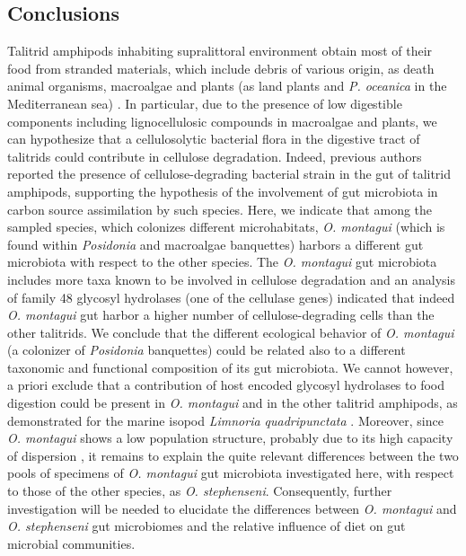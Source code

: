 \subsection{Conclusions}
Talitrid amphipods inhabiting supralittoral environment obtain most of their food from stranded materials, which include debris of various origin, as death animal organisms, macroalgae and plants (as land plants and \textit{P. oceanica} in the Mediterranean sea) \cite{adin2003preferential, colombini2011food}. In particular, due to the presence of low digestible components including lignocellulosic compounds in macroalgae and plants, we can hypothesize that a cellulosolytic bacterial flora in the digestive tract of talitrids could contribute in cellulose degradation. Indeed, previous authors \cite{nuti1971microrganisms, olabarria2009intraspecific} reported the presence of cellulose-degrading bacterial strain in the gut of talitrid amphipods, supporting the hypothesis of the involvement of gut microbiota in carbon source assimilation by such species. Here, we indicate that among the sampled species, which colonizes different microhabitats, \textit{O. montagui} (which is found within \textit{Posidonia} and macroalgae banquettes) harbors a different gut microbiota with respect to the other species. The \textit{O. montagui} gut microbiota includes more taxa known to be involved in cellulose degradation and an analysis of family 48 glycosyl hydrolases (one of the cellulase genes) indicated that indeed \textit{O. montagui} gut harbor a higher number of cellulose-degrading cells than the other talitrids. We conclude that the different ecological behavior of \textit{O. montagui} (a colonizer of \textit{Posidonia} banquettes) could be related also to a different taxonomic and functional composition of its gut microbiota. We cannot however, a priori exclude that a contribution of host encoded glycosyl hydrolases to food digestion could be present in \textit{O. montagui} and in the other talitrid amphipods, as demonstrated for the marine isopod \textit{Limnoria quadripunctata} \cite{king2010molecular}. Moreover, since \textit{O. montagui} shows a low population structure, probably due to its high capacity of dispersion \cite{matthaeis2000isolation}, it remains to explain the quite relevant differences between the two pools of specimens of \textit{O. montagui} gut microbiota investigated here, with respect to those of the other species, as \textit{O. stephenseni}. Consequently, further investigation will be needed to elucidate the differences between \textit{O. montagui} and \textit{O. stephenseni} gut microbiomes and  the relative influence of diet on gut microbial communities.\\

